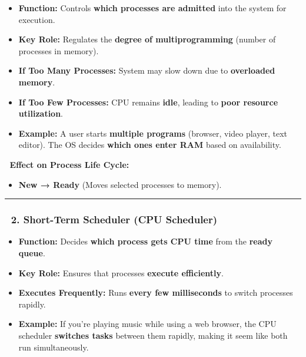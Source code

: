 \documentclass[
]{article}
\providecommand{\tightlist}{%
  \setlength{\itemsep}{0pt}\setlength{\parskip}{0pt}}
\begin{document}
\begin{itemize}
\tightlist
\item
  \textbf{Function:} Controls \textbf{which processes are admitted} into
  the system for execution.
\item
  \textbf{Key Role:} Regulates the \textbf{degree of multiprogramming}
  (number of processes in memory).
\item
  \textbf{If Too Many Processes:} System may slow down due to
  \textbf{overloaded memory}.
\item
  \textbf{If Too Few Processes:} CPU remains \textbf{idle}, leading to
  \textbf{poor resource utilization}.
\item
  \textbf{Example:} A user starts \textbf{multiple programs} (browser,
  video player, text editor). The OS decides \textbf{which ones enter
  RAM} based on availability.
\end{itemize}

📌 \textbf{Effect on Process Life Cycle:}

\begin{itemize}
\tightlist
\item
  \textbf{New → Ready} (Moves selected processes to memory).
\end{itemize}

\begin{center}\rule{0.5\linewidth}{0.5pt}\end{center}

\subsubsection{\texorpdfstring{\textbf{📍 2. Short-Term Scheduler (CPU
Scheduler)}}{📍 2. Short-Term Scheduler (CPU Scheduler)}}\label{short-term-scheduler-cpu-scheduler}

\begin{itemize}
\tightlist
\item
  \textbf{Function:} Decides \textbf{which process gets CPU time} from
  the \textbf{ready queue}.
\item
  \textbf{Key Role:} Ensures that processes \textbf{execute
  efficiently}.
\item
  \textbf{Executes Frequently:} Runs \textbf{every few milliseconds} to
  switch processes rapidly.
\item
  \textbf{Example:} If you're playing music while using a web browser,
  the CPU scheduler \textbf{switches tasks} between them rapidly, making
  it seem like both run simultaneously.
\end{itemize}
\end{document}
